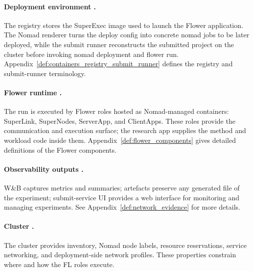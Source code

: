 \hypertarget{implcomp:deploy}{}
\paragraph[Deployment environment.]{Deployment environment .}
The registry stores the SuperExec image used to launch the Flower application. The Nomad renderer turns the deploy config into concrete nomad jobs to be later deployed, while the submit runner reconstructs the submitted project on the cluster before invoking nomad deployment and flower run. Appendix~\ref{def:containers_registry_submit_runner} defines the registry and submit-runner terminology.

\hypertarget{implcomp:runtime}{}
\paragraph[Flower runtime.]{Flower runtime .}
The run is executed by Flower roles hosted as Nomad-managed containers: SuperLink, SuperNodes, ServerApp, and ClientApps. These roles provide the communication and execution surface; the research app supplies the method and workload code inside them. Appendix~\ref{def:flower_components} gives detailed definitions of the Flower components.

\hypertarget{implcomp:observability}{}
\paragraph[Observability outputs.]{Observability outputs .}
W\&B captures metrics and summaries; artefacts preserve any generated file of the experiment; submit-service UI provides a web interface for monitoring and managing experiments. See Appendix~\ref{def:network_evidence} for more details.

\hypertarget{implcomp:substrate}{}
\paragraph[Cluster.]{Cluster .}
The cluster provides inventory, Nomad node labels, resource reservations, service networking, and deployment-side network profiles. These properties constrain where and how the FL roles execute.

